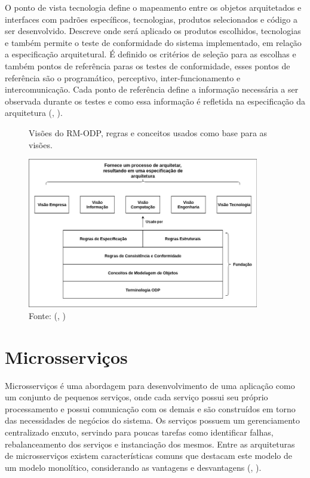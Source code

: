 \documentclass[]{politex}
\begin{document}
O ponto de vista tecnologia define o mapeamento entre os objetos arquitetados e interfaces com padrões específicos, tecnologias, produtos selecionados e código a ser desenvolvido. Descreve onde será aplicado os produtos escolhidos, tecnologias e também permite o teste de conformidade do sistema implementado, em relação a especificação arquitetural. É definido os critérios de seleção para as escolhas e também pontos de referência paras os testes de conformidade, esses pontos de referência são o programático, perceptivo, inter-funcionamento e intercomunicação. Cada ponto de referência define a informação necessária a ser observada durante os testes e como essa informação é refletida na especificação da arquitetura (, \citeyear{putman2001architecting}).

\begin{figure}[H]
    \centering
    \caption{Visões do RM-ODP, regras e conceitos usados como base para as visões.}
    \includegraphics[width=0.9\textwidth]{VisoesRM-ODP}
    \caption*{Fonte: (, \citeyear{putman2001architecting})}
    \label{fig:visoes_rmodp}
\end{figure}

\section{Microsserviços}
Microsserviços é uma abordagem para desenvolvimento de uma aplicação como um conjunto de pequenos serviços, onde cada serviço possui seu próprio processamento e possui comunicação com os demais e são construídos em torno das necessidades de negócios do sistema. Os serviços possuem um gerenciamento centralizado enxuto, servindo para poucas tarefas como identificar falhas, rebalanceamento dos serviços e instanciação dos mesmos. Entre as arquiteturas de microsserviços existem características comuns que destacam este modelo de um modelo monolítico, considerando as vantagens e desvantagens (, \citeyear{martinfowler2014microservices}).
\end{document}
